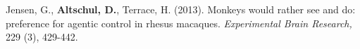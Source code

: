 \documentclass[margin,line]{res}
\begin{document}





Jensen, G., {\bf Altschul, D.}, Terrace, H. (2013). Monkeys would rather see and do: preference for agentic control in rhesus macaques. {\it Experimental Brain Research,} 229 (3), 429-442.
\end{document}
